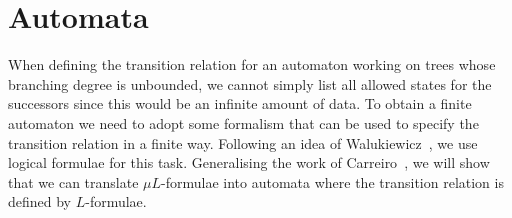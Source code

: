 \documentclass[10pt, fleqn]{scrartcl}
\newcommand*{\?}{\kern .08em}
\begin{document}
\section{Automata}   %
\label{Sect: automata}


When defining the transition relation for an automaton working on trees whose branching degree
is unbounded, we cannot simply list all allowed states for the successors since this
would be an infinite amount of data. To obtain a finite automaton we need to
adopt some formalism that can be used to specify the transition relation in a finite way.
Following an idea of Walukiewicz~\cite{Walukiewicz02}, we use logical formulae for this task.
Generalising the work of Carreiro~\cite{Carreiro15}, we will show that we can translate
$\mu L$-formulae into automata where the transition relation is defined by $L$-formulae.
\end{document}
